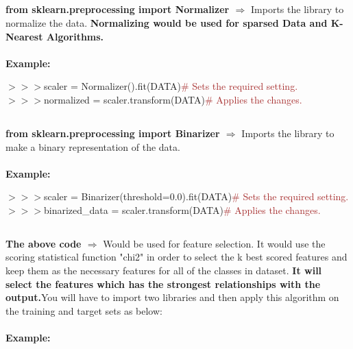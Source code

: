 \documentclass[a4paper,18pt]{article}
\begin{document}

\subsection{\colorbox {matgreen}{\color{white}{\large from sklearn.preprocessing import Normalizer}}}
\textbf{from sklearn.preprocessing import Normalizer $\Rightarrow$} Imports the library to normalize the data. {\textbf{\textcolor{important}{Normalizing would be used for sparsed Data and K-Nearest Algorithms.}}}\\\\
\textbf{Example:\\}

$>>>$scaler = Normalizer().fit(DATA){\textcolor{brown}{\# Sets the required setting.}}\\

$>>>$normalized = scaler.transform(DATA){\textcolor{brown}{\# Applies the changes.}}\\


\subsection{\colorbox {matgreen}{\color{white}{\large from sklearn.preprocessing import Binarizer}}}
\textbf{from sklearn.preprocessing import Binarizer $\Rightarrow$} Imports the library to make a binary representation of the data.\\\\
\textbf{Example:\\}

$>>>$scaler = Binarizer(threshold=0.0).fit(DATA){\textcolor{brown}{\# Sets the required setting.}}\\

$>>>$binarized\_data = scaler.transform(DATA){\textcolor{brown}{\# Applies the changes.}}\\



\subsection{\colorbox {matgreen}{\color{white}{\large SelectKBest(score\_func=chi2,k=4)}}}
\textbf{The above code $\Rightarrow$} Would be used for feature selection. It would use the scoring statistical function "chi2" in order to select the k best scored features and keep them as the necessary features for all of the classes in dataset. {\textbf{\textcolor{important}{It will select the features which has the strongest relationships with the output.}}}You will have to import two libraries and then apply this algorithm on the training and target sets as below:\\\\
\textbf{Example:\\}
\end{document}
